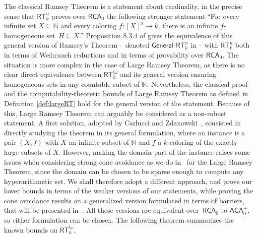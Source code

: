 \documentclass{article}
\newcommand{\RCA}[0]{\mathsf{RCA}}
\newcommand{\ACA}[0]{\mathsf{ACA}}
\newcommand{\RT}[0]{\mathsf{RT}}
\newcommand{\NN}[0]{\mathbb{N}}
\def\qt#1{``#1''}%
\numberwithin{theorem}{section}
\newcommand{\ludovic}[1]{\textcolor{blue}{#1}}
\newcommand{\lorenzo}[1]{\textcolor{orange}{#1}}
\begin{document}
The classical Ramsey Theorem is a statement about cardinality, in the precise sense that $\RT^n_k$ proves over $\RCA_0$ the following stronger statement \qt{For every infinite set $X \subseteq \NN$ and every coloring $f : [X]^n \to k$, there is an infinite $f$-homogeneous set~$H \subseteq X$.} Proposition 8.3.4 of \cite{Dza-Mum:22} gives the equivalence of this general version of Ramsey's Theorem -- denoted $\mathsf{General}$-$\RT^n_k$ in \cite{Dza-Mum:22} -- with $\RT^n_k$ both in terms of Weihrauch reductions and in terms of provability over $\RCA_0$. The situation is more complex in the case of Large Ramsey Theorem, as there is no clear direct equivalence between $\RT^{!\omega}_k$ and its general version ensuring homogeneous sets in any countable subset of $\NN$.
Nevertheless, the classical proof and the computability-theoretic bounds of Large Ramsey Theorem as defined in Definition \ref{def:largeRT} hold for the general version of the statement. Because of this, Large Ramsey Theorem can arguably be considered as a non-robust statement. A first solution, adopted by Carlucci and Zdanowski~\cite{carlucci2014strength}, consisted in directly studying the theorem in its general formulation, where an instance is a pair $(X, f)$ with $X$ an infinite subset of $\NN$ and $f$ a $k$-coloring of the exactly large subsets of $X$. However, making the domain part of the instance raises some issues when considering strong cone avoidance as we do in~ for the Large Ramsey Theorem, since the domain can be chosen to be sparse enough to compute any hyperarithmetic set. We shall therefore adopt a different approach, and prove our lower bounds in terms of the weaker versions of our statements, while proving the cone avoidance results on a generalized version formulated in terms of barriers, that will be presented in~. All these versions are equivalent over~$\RCA_0$ to $\ACA_0^+$, so either formulation can be chosen.
The following theorem summarizes the known bounds on $\RT^{!\omega}_k$. 
\end{document}
